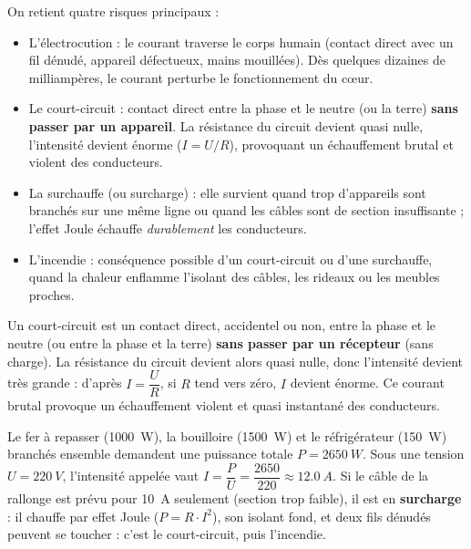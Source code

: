 \documentclass[11pt]{article}
\newcommand{\cle}[1]{{\popxbold\color{popdark}#1}}
\begin{document}
On retient quatre risques principaux :

\begin{itemize}
\item L'\cle{électrocution} : le courant traverse le corps humain (contact direct avec un fil dénudé, appareil défectueux, mains mouillées). Dès quelques dizaines de milliampères, le courant perturbe le fonctionnement du cœur.
\item Le \cle{court-circuit} : contact direct entre la phase et le neutre (ou la terre) \textbf{sans passer par un appareil}. La résistance du circuit devient quasi nulle, l'intensité devient énorme ($I = U/R$), provoquant un échauffement brutal et violent des conducteurs.
\item La \cle{surchauffe} (ou surcharge) : elle survient quand trop d'appareils sont branchés sur une même ligne ou quand les câbles sont de section insuffisante ; l'effet Joule échauffe \emph{durablement} les conducteurs.
\item L'\cle{incendie} : conséquence possible d'un court-circuit ou d'une surchauffe, quand la chaleur enflamme l'isolant des câbles, les rideaux ou les meubles proches.
\end{itemize}

\begin{definition}
Un \cle{court-circuit} est un contact direct, accidentel ou non, entre la phase et le neutre (ou entre la phase et la terre) \textbf{sans passer par un récepteur} (sans charge). La résistance du circuit devient alors quasi nulle, donc l'intensité devient très grande : d'après $I = \dfrac{U}{R}$, si $R$ tend vers zéro, $I$ devient énorme. Ce courant brutal provoque un échauffement violent et quasi instantané des conducteurs.
\end{definition}

\begin{exemplebox}
Le fer à repasser (\SI{1000}{W}), la bouilloire (\SI{1500}{W}) et le réfrigérateur (\SI{150}{W}) branchés ensemble demandent une puissance totale $P = \SI{2650}{W}$. Sous une tension $U = \SI{220}{V}$, l'intensité appelée vaut $I = \dfrac{P}{U} = \dfrac{2650}{220} \approx \SI{12,0}{A}$. Si le câble de la rallonge est prévu pour \SI{10}{A} seulement (section trop faible), il est en \textbf{surcharge} : il chauffe par effet Joule ($P = R \cdot I^{2}$), son isolant fond, et deux fils dénudés peuvent se toucher : c'est le court-circuit, puis l'incendie.
\end{exemplebox}
\end{document}
